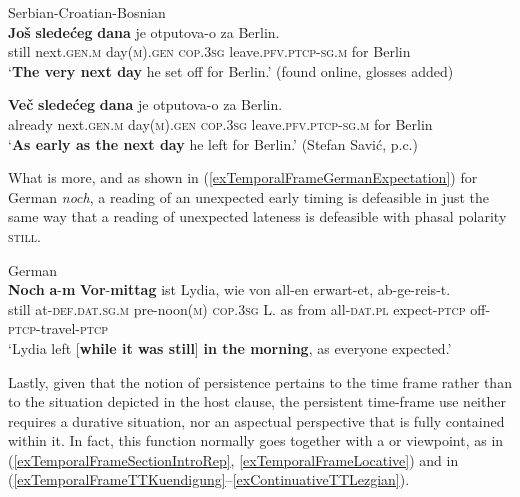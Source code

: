 \begin{exe}
	Serbian-Croatian-Bosnian\\
	\gll \textbf{Još} \textbf{sledećeg} \textbf{dana} je otputova-o za Berlin.\\
 	 still next.\textsc{gen}.\textsc{m} day(\textsc{m}).\textsc{gen} \textsc{cop}.3\textsc{sg} leave.\textsc{pfv}.\textsc{ptcp}-\textsc{sg}.\textsc{m} for Berlin\\
	 \glt  \lq \textbf{The very next day} he set off for Berlin.\rq{ }(found online, glosses added)
	 
	 \ex\label{exTemporalFrameMedSchoolAlreadySerbian}
	\gll \textbf{Več} \textbf{sledećeg} \textbf{dana} je otputova-o za Berlin.\\
	already next.\textsc{gen}.\textsc{m} day(\textsc{m}).\textsc{gen} \textsc{cop}.3\textsc{sg} leave.\textsc{pfv}.\textsc{ptcp}-\textsc{sg}.\textsc{m} for Berlin\\
	\glt \lq \textbf{As early as the next day} he left for Berlin.' (Stefan Savić, p.c.)
\end{exe}
What is more, and as shown in (\ref{exTemporalFrameGermanExpectation}) for German \textit{noch}, a reading of an unexpected early timing is defeasible in just the same way that a reading of unexpected lateness is defeasible with phasal polarity \textsc{still}.

\begin{exe}
	\ex German\label{exTemporalFrameGermanExpectation}\\
	\gll \textbf{Noch} \textbf{a}-\textbf{m} \textbf{Vor}-\textbf{mittag} ist Lydia, wie von all-en erwart-et, ab-ge-reis-t.\\
	still at-\textsc{def}.\textsc{dat}.\textsc{sg}.\textsc{m} pre-noon(\textsc{m}) \textsc{cop}.3\textsc{sg} L. as from all-\textsc{dat}.\textsc{pl} expect-\textsc{ptcp} off-\textsc{ptcp}-travel-\textsc{ptcp}\\
	\glt \lq Lydia left [\textbf{while it was still}] \textbf{in the morning}, as everyone expected.\rq
	\\\parencite[27 fn10]{Beck2020}
\end{exe}

Lastly, given that the notion of persistence pertains to the time frame rather than to the situation depicted in the host clause, the persistent time-frame use neither requires a durative situation, nor an aspectual perspective that is fully contained within it. In fact, this function normally goes together with a  or  viewpoint, as in (\ref{exTemporalFrameSectionIntroRep}, \ref{exTemporalFrameLocative}) and in (\ref{exTemporalFrameTTKuendigung}–\ref{exContinuativeTTLezgian}).


